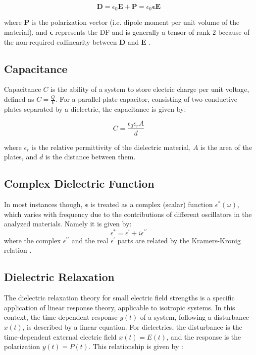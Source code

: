 \[
	\mathbf{D} = \epsilon_0 \mathbf{E} + \mathbf{P} = \epsilon_0 \boldsymbol{\epsilon} \mathbf{E}
\]

where \( \mathbf{P} \) is the polarization vector (i.e. dipole moment per unit volume of the material), and \( \boldsymbol{\epsilon} \) represents the \ac{DF}
and is generally a tensor of rank 2 because of the non-required collinearity between \( \mathbf{D} \) and \( \mathbf{E} \) \cite{grundmann2021}.


\subsection{Capacitance}

Capacitance \(C\) is the ability of a system to store electric charge per unit voltage, defined as \(C = \frac{Q}{V}\). For a parallel-plate capacitor, consisting of two conductive plates separated by a dielectric, the capacitance is given by:

\begin{equation}
\label{parallelplate}
C = \frac{\epsilon_0 \epsilon_r A}{d}
\end{equation}

where \( \epsilon_r \) is the relative permittivity of the dielectric material, \( A \) is the area of the plates, and \( d \) is the distance between them.

\subsection{Complex Dielectric Function}


In most instances though, \(\boldsymbol{ \epsilon }\) is treated as a complex (scalar) function \( \epsilon^*(\omega) \), which varies with frequency due to the contributions of different oscillators in the analyzed materials. Namely it is given by: \[
	\epsilon^* = \epsilon^\prime + i \epsilon^{\prime \prime}
\]
where the complex $\epsilon^{\prime \prime}$ and the real $\epsilon^\prime$ parts are related by the Kramers-Kronig relation \cite{booij1982}.

\subsection{Dielectric Relaxation}

The dielectric relaxation theory for small electric field strengths is a specific application of linear response theory, applicable to isotropic systems. In this context, the time-dependent response \( y(t) \) of a system, following a disturbance \( x(t) \), is described by a linear equation. For dielectrics, the disturbance is the time-dependent external electric field \( x(t) = E(t) \), and the response is the polarization \( y(t) = P(t) \). This relationship is given by \cite{kremer2003}:

